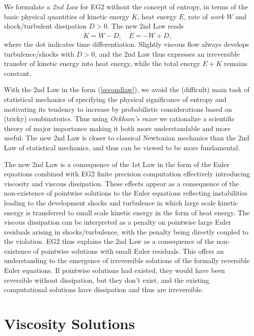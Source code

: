 We formulate a \emph{2nd Law} for EG2 
without the concept of entropy, in terms of  
the basic physical quantities of kinetic energy
$K$, heat energy $E$, rate of \emph{work} $W$ and shock/turbulent dissipation
$D>0$. The new 2nd Law reads
\begin{equation}\label{secondlaw}
\dot K=W-D,\quad \dot E=-W+D,
\end{equation}
where the dot indicates time differentiation. Slightly viscous
flow always develops turbulence/shocks with $D>0$, and the  
2nd Law thus expresses an irreversible transfer of kinetic energy
into heat energy, while the total energy $E+K$ remains constant.

With the 2nd Law in the form (\ref{secondlaw}), we 
avoid the (difficult) main task of 
statistical mechanics 
of specifying the physical significance of entropy and motivating its
tendency to increase by probabilistic considerations based on
(tricky) combinatorics. Thus using \emph{Ockham's razor} %
we rationalize a scientific theory of major importance making it both
more understandable and more useful. The new 2nd Law is closer to 
classical Newtonian mechanics than the 2nd Law of statistical mechanics, 
and thus can be viewed to be more fundamental. 

The new 2nd Law is a consequence of the 1st Law 
in the form of the Euler equations combined with EG2
finite precision computation effectively introducing 
viscosity and viscous dissipation. These effects 
appear as a consequence of the non-existence of pointwise solutions to 
the Euler equations reflecting instabilities leading to 
the development shocks and turbulence in which
large scale kinetic energy is transferred to small scale
kinetic energy in the form of heat energy. The viscous dissipation
can be interpreted as a penalty on pointwise
large Euler residuals arising in shocks/turbulence,
with the penalty being directly coupled to the violation. EG2 
thus explains the 2nd Law as a consequence of 
the non-existence of pointwise solutions with small Euler residuals.
This offers an understanding to the emergence of irreversible
solutions of the formally reversible Euler equations. 
If pointwise solutions had existed, they would have been 
reversible without dissipation, but they don't exist, and the
existing computational solutions have dissipation and thus are
irreversible.

\section{Viscosity Solutions}

